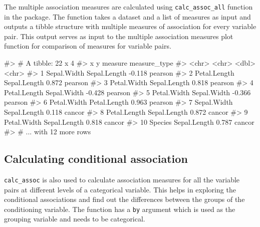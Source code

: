 The multiple association measures are calculated using
\texttt{calc\_assoc\_all} function in the package. The function takes a
dataset and a list of measures as input and outputs a tibble structure
with multiple measures of association for every variable pair. This
output serves as input to the multiple association measures plot
function for comparison of measures for variable pairs.

\begin{Schunk}
\begin{Soutput}
#> # A tibble: 22 x 4
#>    x            y            measure measure_type
#>    <chr>        <chr>          <dbl> <chr>       
#>  1 Sepal.Width  Sepal.Length  -0.118 pearson     
#>  2 Petal.Length Sepal.Length   0.872 pearson     
#>  3 Petal.Width  Sepal.Length   0.818 pearson     
#>  4 Petal.Length Sepal.Width   -0.428 pearson     
#>  5 Petal.Width  Sepal.Width   -0.366 pearson     
#>  6 Petal.Width  Petal.Length   0.963 pearson     
#>  7 Sepal.Width  Sepal.Length   0.118 cancor      
#>  8 Petal.Length Sepal.Length   0.872 cancor      
#>  9 Petal.Width  Sepal.Length   0.818 cancor      
#> 10 Species      Sepal.Length   0.787 cancor      
#> # ... with 12 more rows
\end{Soutput}
\end{Schunk}

\hypertarget{calculating-conditional-association}{%
\subsection{Calculating conditional
association}\label{calculating-conditional-association}}

\texttt{calc\_assoc} is also used to calculate association measures for
all the variable pairs at different levels of a categorical variable.
This helps in exploring the conditional associations and find out the
differences between the groups of the conditioning variable. The
function has a \texttt{by} argument which is used as the grouping
variable and needs to be categorical.

